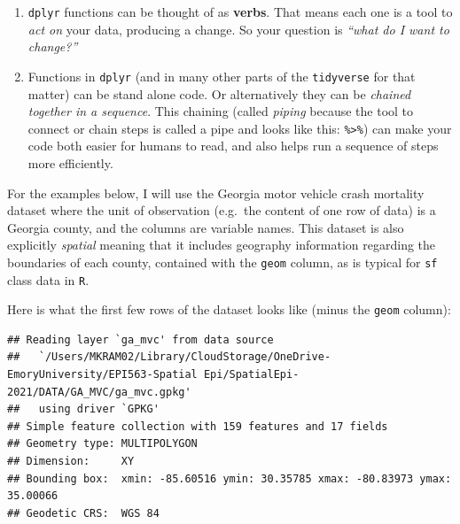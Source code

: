 \documentclass[
]{book}
\providecommand{\tightlist}{%
  \setlength{\itemsep}{0pt}\setlength{\parskip}{0pt}}
\begin{document}
\begin{enumerate}
\def\labelenumi{\arabic{enumi}.}
\tightlist
\item
  \texttt{dplyr} functions can be thought of as \textbf{verbs}. That means each one is a tool to \emph{act on} your data, producing a change. So your question is \emph{``what do I want to change?''}
\item
  Functions in \texttt{dplyr} (and in many other parts of the \texttt{tidyverse} for that matter) can be stand alone code. Or alternatively they can be \emph{chained together in a sequence}. This chaining (called \emph{piping} because the tool to connect or chain steps is called a pipe and looks like this: \texttt{\%\textgreater{}\%}) can make your code both easier for humans to read, and also helps run a sequence of steps more efficiently.
\end{enumerate}

For the examples below, I will use the Georgia motor vehicle crash mortality dataset where the unit of observation (e.g.~the content of one row of data) is a Georgia county, and the columns are variable names. This dataset is also explicitly \emph{spatial} meaning that it includes geography information regarding the boundaries of each county, contained with the \texttt{geom} column, as is typical for \texttt{sf} class data in \texttt{R}.

Here is what the first few rows of the dataset looks like (minus the \texttt{geom} column):

\begin{verbatim}
## Reading layer `ga_mvc' from data source 
##   `/Users/MKRAM02/Library/CloudStorage/OneDrive-EmoryUniversity/EPI563-Spatial Epi/SpatialEpi-2021/DATA/GA_MVC/ga_mvc.gpkg' 
##   using driver `GPKG'
## Simple feature collection with 159 features and 17 fields
## Geometry type: MULTIPOLYGON
## Dimension:     XY
## Bounding box:  xmin: -85.60516 ymin: 30.35785 xmax: -80.83973 ymax: 35.00066
## Geodetic CRS:  WGS 84
\end{verbatim}
\end{document}
